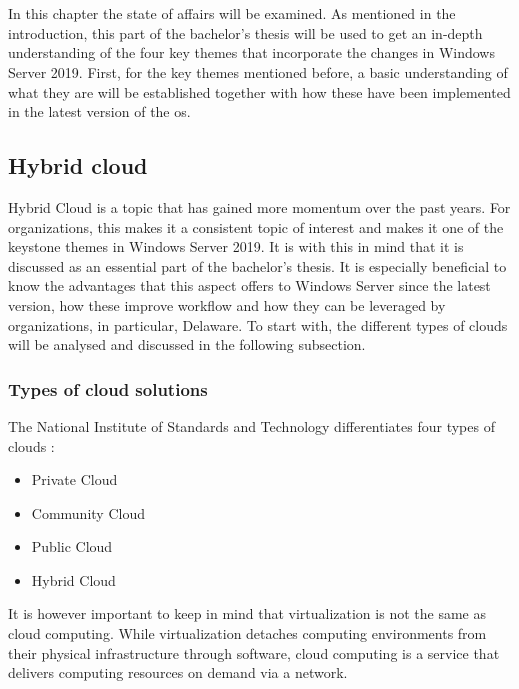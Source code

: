 \chapter{}
\label{ch:stand-van-zaken}
In this chapter the state of affairs will be examined. As mentioned in the introduction, this part of the bachelor's thesis will be used to get an in-depth understanding of the four key themes that incorporate the changes in Windows Server 2019. First, for the key themes mentioned before, a basic understanding of what they are will be established together with how these have been implemented in the latest version of the \acrshort{os}.

\section{Hybrid cloud}
Hybrid Cloud is a topic that has gained more momentum over the past years. For organizations, this makes it a consistent topic of interest and makes it one of the keystone themes in Windows Server 2019. \autocite{MWST2018} It is with this in mind that it is discussed as an essential part of the bachelor's thesis. It is especially beneficial to know the advantages that this aspect offers to Windows Server since the latest version, how these improve workflow and how they can be leveraged by organizations, in particular, Delaware. To start with, the different types of clouds will be analysed and discussed in the following subsection.

\subsection{Types of cloud solutions}
The National Institute of Standards and Technology differentiates four types of clouds \autocite{Mell2011}:
\begin{itemize}
	\item Private Cloud
	\item Community Cloud
	\item Public Cloud
	\item Hybrid Cloud
\end{itemize}	
It is  however important to keep in mind that virtualization is not the same as cloud computing. While virtualization detaches computing environments from their physical infrastructure through software, cloud computing is a service that delivers computing resources on demand via a network. \autocite{Naeem2016}


